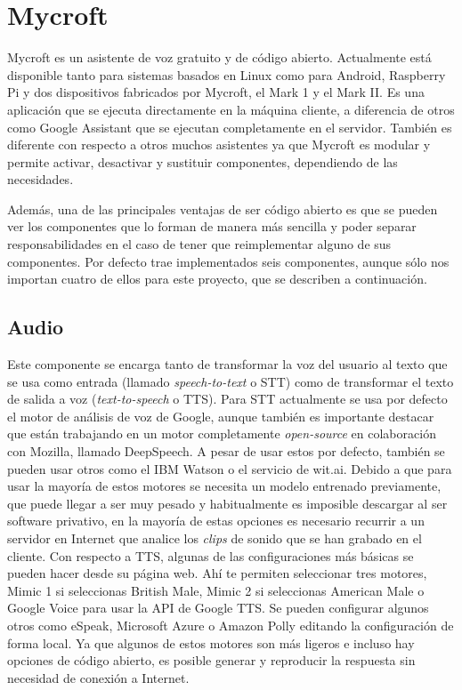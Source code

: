 \section{Mycroft}
Mycroft \cite{mycroft} es un asistente de voz gratuito y de código abierto. Actualmente está disponible tanto para sistemas basados en Linux como para Android, Raspberry Pi y dos dispositivos fabricados por Mycroft, el Mark 1 y el Mark II.
Es una aplicación que se ejecuta directamente en la máquina cliente, a diferencia de otros como Google Assistant que se ejecutan completamente en el servidor. También es diferente con respecto a otros muchos asistentes ya que Mycroft es modular y permite activar, desactivar y sustituir componentes\cite{mycroftcomponents}, dependiendo de las necesidades.

Además, una de las principales ventajas de ser código abierto es que se pueden ver los componentes que lo forman de manera más sencilla y poder separar responsabilidades en el caso de tener que reimplementar alguno de sus componentes. Por defecto trae implementados seis componentes, aunque sólo nos importan cuatro de ellos para este proyecto, que se describen a continuación.
\subsection{Audio}
Este componente se encarga tanto de transformar la voz del usuario al texto que se usa como entrada (llamado \textit{speech-to-text} o STT) como de transformar el texto de salida a voz (\textit{text-to-speech} o TTS).
Para STT actualmente se usa por defecto el motor de análisis de voz de Google, aunque también es importante destacar que están trabajando en un motor completamente \textit{open-source} en colaboración con Mozilla, llamado DeepSpeech. A pesar de usar estos por defecto, también se pueden usar otros como el IBM Watson o el servicio de wit.ai. Debido a que para usar la mayoría de estos motores se necesita un modelo entrenado previamente, que puede llegar a ser muy pesado y habitualmente es imposible descargar al ser software privativo, en la mayoría de estas opciones es necesario recurrir a un servidor en Internet que analice los \textit{clips} de sonido que se han grabado en el cliente.
Con respecto a TTS, algunas de las configuraciones más básicas se pueden hacer desde su página web. Ahí te permiten seleccionar tres motores, Mimic 1 si seleccionas British Male, Mimic 2 si seleccionas American Male o Google Voice para usar la API de Google TTS. Se pueden configurar algunos otros como eSpeak, Microsoft Azure o Amazon Polly editando la configuración de forma local. Ya que algunos de estos motores son más ligeros e incluso hay opciones de código abierto, es posible generar y reproducir la respuesta sin necesidad de conexión a Internet.
